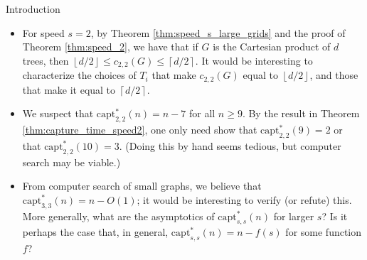 \documentclass[12pt]{amsart}
\newcommand{\floor}[1]{\ensuremath{\left\lfloor #1\right\rfloor} }
\newcommand{\ceil}[1]{\ensuremath{\left\lceil #1\right\rceil} }
\theoremstyle{definition}
\newcommand{\speedtwo}{c_{2,2}}
\newcommand{\capt}[1]{\mathrm{capt}_{#1,#1}}
\begin{document}
\begin{section}{Introduction}
\begin{itemize}
\item For speed $s=2$, by Theorem \ref{thm:speed_s_large_grids} and the proof of Theorem \ref{thm:speed_2}, we have that if $G$ is the Cartesian product of $d$ trees, then $\left\lfloor d/2\right\rfloor\le c_{2,2}(G)\le\left\lceil d/2\right\rceil$.  It would be interesting to characterize the choices of $T_i$ that make $\speedtwo(G)$ equal to $\floor{d/2}$, and those that make it equal to $\ceil{d/2}$.\\

\item We suspect that $\capt{2}^*(n)=n-7$ for all $n\ge 9$.  By the result in Theorem \ref{thm:capture_time_speed2}, one only need show that $\capt{2}^*(9)=2$ or that $\capt{2}^*(10)=3$.  (Doing this by hand seems tedious, but computer search may be viable.)\\

\item From computer search of small graphs, we believe that $\capt{3}^*(n)=n-O(1)$; it would be interesting to verify (or refute) this.  More generally, what are the asymptotics of $\capt{s}^*(n)$ for larger $s$?  Is it perhaps the case that, in general, $\capt{s}^*(n) = n - f(s)$ for some function $f$?  
\end{itemize}
\end{section}
\end{document}
